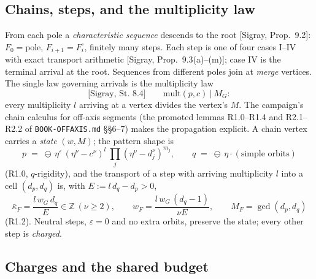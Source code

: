 \documentclass[11pt]{article}
\theoremstyle{definition}
\theoremstyle{remark}
\newcommand{\kb}{\bar\kappa}
\begin{document}
\subsection{Chains, steps, and the multiplicity law}\label{sec:chains}

From each pole a \emph{characteristic sequence} descends to the root [Sigray, Prop.~9.2]: $F_0=\mathrm{pole}$, $F_{i+1}=F_i^{\circ}$, finitely many steps. Each step is one of four cases I--IV with exact transport arithmetic [Sigray, Prop.~9.3(a)--(m)]; case IV is the terminal arrival at the root. Sequences from different poles join at \emph{merge} vertices. The single law governing arrivals is the multiplicity law
\begin{equation}\label{eq:st84}
\text{[Sigray, St.~8.4]}\qquad \mathrm{mult}(p,c)\ \big|\ M_G:
\end{equation}
every multiplicity $l$ arriving at a vertex divides the vertex's $M$. The campaign's chain calculus for off-axis segments (the promoted lemmas R1.0--R1.4 and R2.1--R2.2 of \texttt{BOOK-OFFAXIS.md} \S\S6--7) makes the propagation explicit. A chain vertex carries a \emph{state} $(w,M)$; the pattern shape is
\[
p\;=\;\ominus\,\eta^{\varepsilon}\,(\eta^{\nu}-c^{\nu})^{l}\ \textstyle\prod_j(\eta^{\nu}-d_j^{\nu})^{m_j},\qquad q\;=\;\ominus\,\eta\cdot(\text{simple orbits})
\]
(R1.0, $q$-rigidity), and the transport of a step with arriving multiplicity $l$ into a cell $(d_p,d_q)$ is, with $E:=l\,d_q-d_p>0$,
\begin{equation}\label{eq:wlaw}
\kb_F=\frac{l\,w_G\,d_q}{E}\in\mathbb{Z}\ (\nu\geq2),\qquad w_F=\frac{l\,w_G\,(d_q-1)}{\nu E},\qquad M_F=\gcd(d_p,d_q)
\end{equation}
(R1.2). Neutral steps, $\varepsilon=0$ and no extra orbits, preserve the state; every other step is \emph{charged}.

\subsection{Charges and the shared budget}\label{sec:budget}
\end{document}
